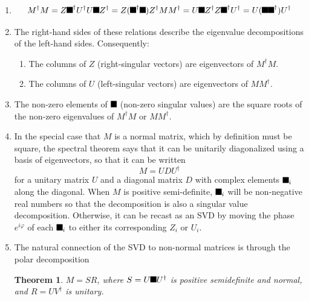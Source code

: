 \documentclass[aps,preprint]{revtex4}%
\providecommand{\U}[1]{\protect\rule{.1in}{.1in}}
\newtheorem{theorem}{Theorem}
\begin{document}
\begin{enumerate}
\item
\begin{equation}
M^{\dagger}M=Z\U{3a3} ^{\dagger}U^{\dagger}U\U{3a3} Z^{\dagger}=Z(\U{3a3}
^{\dagger}\U{3a3} )Z^{\dagger}MM^{\dagger}=U\U{3a3} Z^{\dagger}Z\U{3a3}
^{\dagger}U^{\dagger}=U(\U{3a3} \U{3a3} ^{\dagger})U^{\dagger}%
\end{equation}


\item The right-hand sides of these relations describe the eigenvalue
decompositions of the left-hand sides. Consequently:

\begin{enumerate}
\item The columns of $Z$ (right-singular vectors) are eigenvectors of
$M^{\dagger}M$.

\item The columns of $U$ (left-singular vectors) are eigenvectors of
$MM^{\dagger}$.
\end{enumerate}

\item The non-zero elements of $\U{3a3} $ (non-zero singular values) are the
square roots of the non-zero eigenvalues of $M^{\dagger}M$ or $MM^{\dagger}$.

\item In the special case that $M$ is a normal matrix, which by definition
must be square, the spectral theorem says that it can be unitarily
diagonalized using a basis of eigenvectors, so that it can be written
\begin{equation}
M=UDU^{\dagger}%
\end{equation}
for a unitary matrix $U$ and a diagonal matrix $D$ with complex elements
$\U{3c3} _{i}$ along the diagonal. When $M$ is positive semi-definite,
$\U{3c3} _{i}$ will be non-negative real numbers so that the decomposition is
also a singular value decomposition. Otherwise, it can be recast as an SVD by
moving the phase $e^{i\varphi}$ of each $\U{3c3} _{i}$ to either its
corresponding $Z_{i}$ or $U_{i}.$

\item The natural connection of the SVD to non-normal matrices is through the
polar decomposition

\begin{theorem}
$M=SR$, where $S=U\U{3a3} U^{\dagger}$ is positive semidefinite and normal,
and $R=UV^{\dagger}$ is unitary.
\end{theorem}


\end{enumerate}
\end{document}
